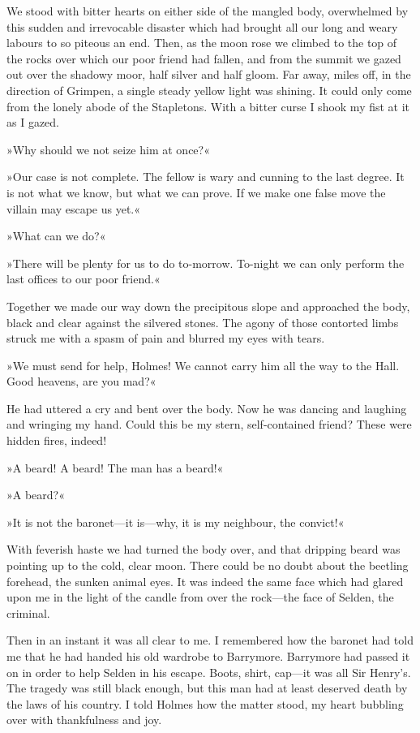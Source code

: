 We stood with bitter hearts on either side of the mangled body, overwhelmed by this sudden and irrevocable disaster which had brought all our long and weary labours to so piteous an end. Then, as the moon rose we climbed to the top of the rocks over which our poor friend had fallen, and from the summit we gazed out over the shadowy moor, half silver and half gloom. Far away, miles off, in the direction of Grimpen, a single steady yellow light was shining. It could only come from the lonely abode of the Stapletons. With a bitter curse I shook my fist at it as I gazed.

»Why should we not seize him at once?«

»Our case is not complete. The fellow is wary and cunning to the last degree. It is not what we know, but what we can prove. If we make one false move the villain may escape us yet.«

»What can we do?«

»There will be plenty for us to do to-morrow. To-night we can only perform the last offices to our poor friend.«

Together we made our way down the precipitous slope and approached the body, black and clear against the silvered stones. The agony of those contorted limbs struck me with a spasm of pain and blurred my eyes with tears.

»We must send for help, Holmes! We cannot carry him all the way to the Hall. Good heavens, are you mad?«

He had uttered a cry and bent over the body. Now he was dancing and laughing and wringing my hand. Could this be my stern, self-contained friend? These were hidden fires, indeed!

»A beard! A beard! The man has a beard!«

»A beard?«

»It is not the baronet\allowbreak---\allowbreak it is\allowbreak---\allowbreak why, it is my neighbour, the convict!«

With feverish haste we had turned the body over, and that dripping beard was pointing up to the cold, clear moon. There could be no doubt about the beetling forehead, the sunken animal eyes. It was indeed the same face which had glared upon me in the light of the candle from over the rock\allowbreak---\allowbreak the face of Selden, the criminal.

Then in an instant it was all clear to me. I remembered how the baronet had told me that he had handed his old wardrobe to Barrymore. Barrymore had passed it on in order to help Selden in his escape. Boots, shirt, cap\allowbreak---\allowbreak it was all Sir Henry's. The tragedy was still black enough, but this man had at least deserved death by the laws of his country. I told Holmes how the matter stood, my heart bubbling over with thankfulness and joy.

